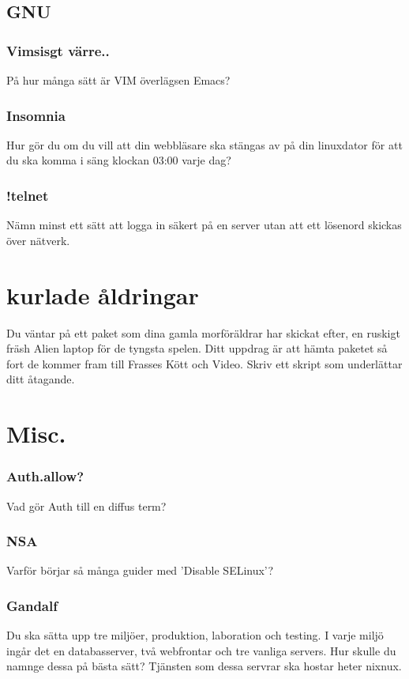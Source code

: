 \documentclass[a4paper]{report}
\begin{document}
\subsection{GNU}

\subsubsection{Vimsisgt värre..}
På hur många sätt är VIM överlägsen Emacs?

\subsubsection{Insomnia}
Hur gör du om du vill att din webbläsare ska stängas av på din linuxdator för att du ska komma i säng klockan 03:00 varje dag?

\subsubsection{!telnet}
Nämn minst ett sätt att logga in säkert på en server utan att ett lösenord skickas över nätverk.

\section{kurlade åldringar}
Du väntar på ett paket som dina gamla morföräldrar har skickat efter, en ruskigt fräsh Alien laptop för de tyngsta spelen. Ditt uppdrag är att hämta paketet så fort de kommer fram till Frasses Kött och Video. Skriv ett skript som underlättar ditt åtagande.

\section{Misc.}
\subsubsection{Auth.allow?}
Vad gör Auth till en diffus term?

\subsubsection{NSA}
Varför börjar så många guider med 'Disable SELinux'?


\subsubsection{Gandalf}
Du ska sätta upp tre miljöer, produktion, laboration och testing. I varje miljö ingår det en databasserver, två webfrontar och tre vanliga servers. 
Hur skulle du namnge dessa på bästa sätt?
Tjänsten som dessa servrar ska hostar heter nixnux.
\end{document}
